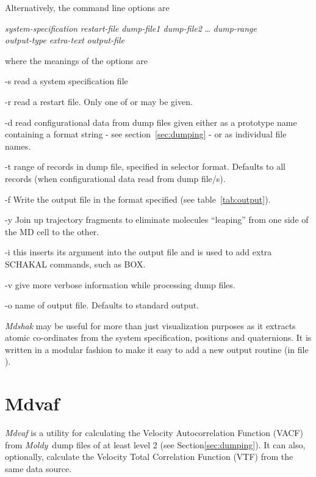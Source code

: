 \documentclass[a4paper,twoside]{report}
\newcommand{\moldy}{\emph{Moldy}}
\begin{document}
Alternatively, the command line options are
\begin{center}
\Lit{[-s} \textit{system-specification} \Lit{|}
 \textit{restart-file}\Lit{]}
\Lit{[-d} \textit{dump-file1 dump-file2} \ldots\Lit{]}
\Lit{[-t} \textit{dump-range}\Lit{]} \\
\Lit{[-f} \textit{output-type}\Lit{]}
\Lit{[-y]}
\Lit{[-i} \textit{extra-text}\Lit{]}
\Lit{[-v]} 
\Lit{[-o} \textit{output-file}\Lit{]}
\end{center}
where the meanings of the options are
\begin{Argdescription}
\item[-s] read a system specification file
\item[-r] read a restart file.  Only one of  or  may
be given.
\item[-d] read configurational data from dump files given either as a prototype name
containing a  format string - see section~\ref{sec:dumping} - or as individual file names.
\item[-t] range of records in dump file, specified in selector
format. Defaults to all records (when configurational data read from dump file/s).
\item[-f] Write the output file in the format specified (see table~\ref{tab:output}).
\item[-y] Join up trajectory fragments to eliminate molecules ``leaping''
  from one side of the MD cell to the other.
\item[-i]   this inserts its argument into the output file and is used
to add extra SCHAKAL commands, such as BOX.
\item[-v] give more verbose information while processing dump files.
\item[-o] name of output file. Defaults to standard output.
\end{Argdescription}

\emph{Mdshak} may be useful for more than just visualization purposes
as it extracts atomic co-ordinates from the system specification,
positions and quaternions.  It is written in a modular fashion
to make it easy to add a new output routine (in file ).

\section{Mdvaf}%
\emph{Mdvaf} is a utility for calculating the Velocity Autocorrelation
Function (VACF) from \moldy\ dump files of at least level 2 (see
Section\ref{sec:dumping}). It can also, optionally, calculate the Velocity
Total Correlation Function (VTF) from the same data source.
\end{document}

